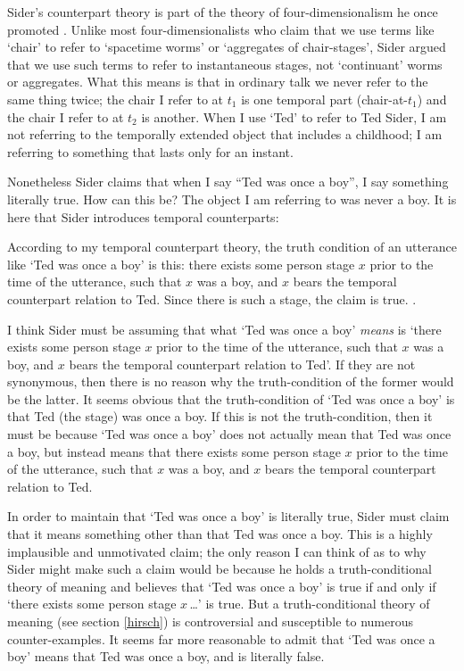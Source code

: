 \documentclass[11pt]{article}
\newenvironment{squote}{%
\begin{spacing}{1}
\begin{list}{}{%
\setlength{\labelwidth}{0pt}%
\rightmargin\leftmargin%
}
\item\relax
}{%
\end{list}%
\end{spacing}
}
\begin{document}
\begin{spacing}{1.5}
Sider's counterpart theory is part of the theory of
four-dimensionalism he once promoted \citeyearpar{sider2001}.  Unlike
most four-dimensionalists who claim that we use terms like `chair' to
refer to `spacetime worms' or `aggregates of chair-stages', Sider
argued that we use such terms to refer to instantaneous stages, not
`continuant' worms or aggregates.  What this means is that in ordinary
talk we never refer to the same thing twice; the chair I refer to at
$t_1$ is one temporal part (chair-at-$t_1$) and the chair I refer to
at $t_2$ is another.  When I use `Ted' to refer to Ted Sider, I am not
referring to the temporally extended object that includes a childhood;
I am referring to something that lasts only for an instant.

Nonetheless Sider claims that when I say ``Ted was once a boy'', I say
something literally true.  How can this be?  The object I am referring
to was never a boy.  It is here that Sider introduces temporal
counterparts:

\begin{squote}
According to my temporal counterpart theory, the truth condition of an
utterance like `Ted was once a boy' is this: there exists some person
stage $x$ prior to the time of the utterance, such that $x$ was a boy,
and $x$ bears the temporal counterpart relation to Ted.  Since there
is such a stage, the claim is true. \citeyearpar[193]{sider2001}.
\end{squote}

I think Sider must be assuming that what `Ted was once a boy' {\em
  means} is `there exists some person stage $x$ prior to the time of
the utterance, such that $x$ was a boy, and $x$ bears the temporal
counterpart relation to Ted'.  If they are not synonymous, then there
is no reason why the truth-condition of the former would be the
latter.  It seems obvious that the truth-condition of `Ted was once a
boy' is that Ted (the stage) was once a boy.  If this is not the
truth-condition, then it must be because `Ted was once a boy' does not
actually mean that Ted was once a boy, but instead means that there
exists some person stage $x$ prior to the time of the utterance, such
that $x$ was a boy, and $x$ bears the temporal counterpart relation to
Ted.

In order to maintain that `Ted was once a boy' is literally true,
Sider must claim that it means something other than that Ted was once
a boy.  This is a highly implausible and unmotivated claim; the only
reason I can think of as to why Sider might make such a claim would be
because he holds a truth-conditional theory of meaning and believes
that `Ted was once a boy' is true if and only if `there exists some
person stage $x$\,\ldots ' is true.  But a truth-conditional theory of
meaning (see section \ref{hirsch}) is controversial and susceptible to
numerous counter-examples.  It seems far more reasonable to admit that
`Ted was once a boy' means that Ted was once a boy, and is literally
false.


\end{spacing}
\end{document}
